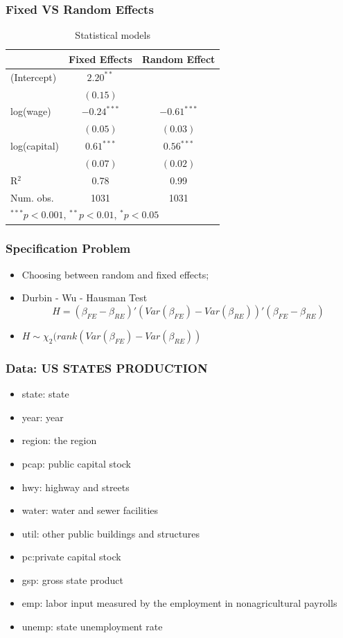 \documentclass{beamer}
\newcommand{\1}{\mathbb{1}}
\begin{document}
\begin{frame}\frametitle{Fixed VS Random Effects}
\begin{table}
\footnotesize
\begin{center}
\begin{tabular}{l c c }
\hline
 & Fixed Effects & Random Effect \\
\hline
(Intercept)  & $2.20^{**}$   &       \\
             &  $(0.15)$     &       \\
log(wage)    & $-0.24^{***}$ &  $-0.61^{***}$             \\
             & $(0.05)$      &   $(0.03)$            \\
log(capital) & $0.61^{***}$  &  $0.56^{***}$            \\
             & $(0.07)$      &  $(0.02)$             \\
\hline
R$^2$        & 0.78          & 0.99          \\
Num. obs.    & 1031          & 1031          \\
\hline
\multicolumn{3}{l}{\scriptsize{$^{***}p<0.001$, $^{**}p<0.01$, $^*p<0.05$}}
\end{tabular}
\caption{Statistical models}
\label{table:coefficients}
\end{center}
\end{table}
\end{frame}

\begin{frame}\frametitle{Specification Problem}
\begin{itemize}
\item Choosing between random and fixed effects;
\item Durbin - Wu - Hausman Test 
\begin{equation}
H = (\beta_{FE} - \beta_{RE})' (Var(\beta_{FE}) - Var(\beta_{RE}))' (\beta_{FE} - \beta_{RE}) 
\end{equation}
\item $H \sim \chi_2(rank(Var(\beta_{FE}) - Var(\beta_{RE}))$
\end{itemize}
\end{frame}

\begin{frame}\frametitle{Data: US STATES PRODUCTION}
\begin{itemize}
\item state: state
\item year: year
\item region: the region
\item pcap: public capital stock
\item hwy: highway and streets
\item water: water and sewer facilities
\item util: other public buildings and structures
\item pc:private capital stock
\item gsp: gross state product
\item emp: labor input measured by the employment in nonagricultural payrolls
\item unemp: state unemployment rate
\end{itemize}
\end{frame}
\end{document}
